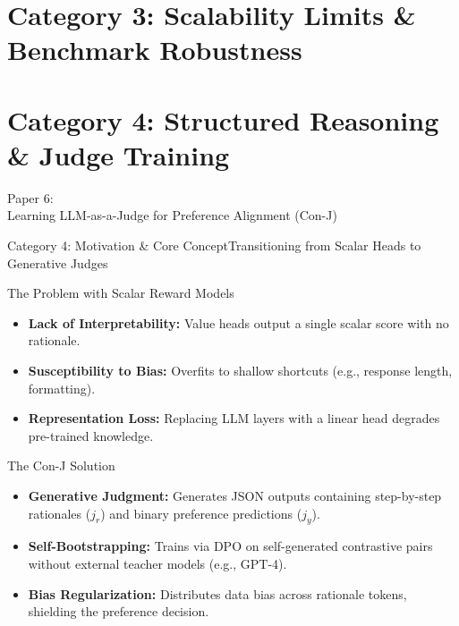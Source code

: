 \documentclass[10pt]{beamer}
\begin{document}
	\section{Category 3: Scalability Limits \& Benchmark Robustness}

	\section{Category 4: Structured Reasoning \& Judge Training}
		\begin{frame}[standout]
		\hypertarget{paper6}{}
		\Large Paper 6:\\Learning LLM-as-a-Judge for Preference Alignment (Con-J)
	\end{frame}


\begin{frame}{Category 4: Motivation \& Core Concept}{Transitioning from Scalar Heads to Generative Judges}
\begin{block}{The Problem with Scalar Reward Models}
    \begin{itemize}
        \item \textbf{Lack of Interpretability:} Value heads output a single scalar score with no rationale.
        \item \textbf{Susceptibility to Bias:} Overfits to shallow shortcuts (e.g., response length, formatting).
        \item \textbf{Representation Loss:} Replacing LLM layers with a linear head degrades pre-trained knowledge.
    \end{itemize}
\end{block}

\begin{block}{The Con-J Solution}
    \begin{itemize}
        \item \textbf{Generative Judgment:} Generates JSON outputs containing step-by-step rationales ($j_r$) and binary preference predictions ($j_y$).
        \item \textbf{Self-Bootstrapping:} Trains via DPO on self-generated contrastive pairs without external teacher models (e.g., GPT-4).
        \item \textbf{Bias Regularization:} Distributes data bias across rationale tokens, shielding the preference decision.
    \end{itemize}
\end{block}
\end{frame}
\end{document}
